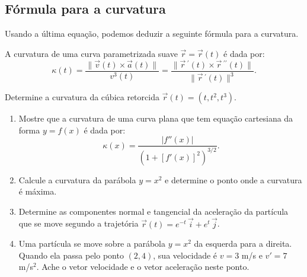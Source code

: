 \subsection*{Fórmula para a curvatura}
\begin{frame}[label=fun-vet]
Usando a última equação, podemos deduzir a seguinte fórmula para a curvatura.
\begin{teo}
A curvatura de uma curva parametrizada suave $\vec{r}=\vec{r}(t)$ é dada por:
\[\kappa(t)=\frac{\|\vec{v}(t)\times \vec{a}(t)\|}{v^3(t)}=\frac{\|\vec{r}\,^\prime(t)\times \vec{r}\,^{\prime\prime}(t)\|}{\|\vec{r}\,^\prime(t)\|^3}.\]
\end{teo}

\begin{exe}
Determine a curvatura da cúbica retorcida $\vec{r}(t)=(t,t^2,t^3)$.
\end{exe}
\end{frame}


\begin{frame}[label=fun-vet]
	\begin{casa}
		\begin{enumerate}
		
	\item  Mostre que a curvatura de uma curva plana que tem equação cartesiana da forma $y=f(x)$ é dada por:
	\[\kappa(x)=\frac{|f''(x)|}{\left(1+[f'(x)]^2\right)^{3/2}}.\]
		
	\item Calcule a curvatura da parábola $y=x^2$ e determine o ponto onde a curvatura é máxima.
	
	\item Determine as componentes normal e tangencial da aceleração da partícula que se move segundo a trajetória $\vec{r}(t)=e^{-t}\,\vec{i}+e^t\,\vec{j}$.
	
	\item Uma partícula se move sobre a parábola $y=x^2$ da esquerda para a direita. Quando ela passa pelo ponto $(2,4)$, sua velocidade é $v=3$ m/s e $v'=7$ m/s$^2$. Ache o vetor velocidade e o vetor aceleração neste ponto.
	
	
		

%			
%			
		\end{enumerate}
	\end{casa}
\end{frame}




